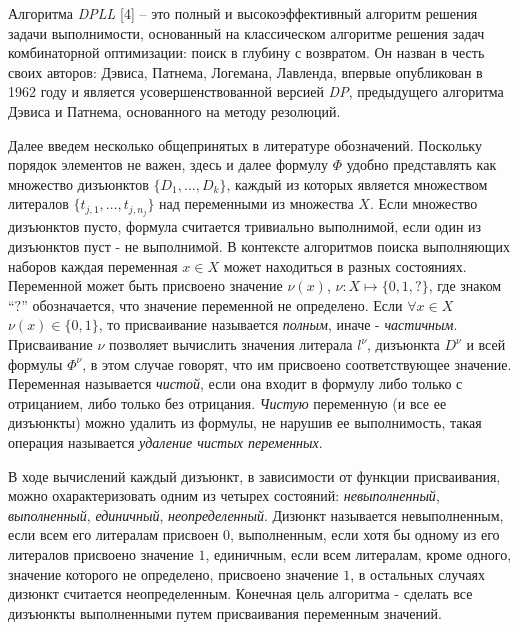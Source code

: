 Алгоритма \textit{DPLL} [4] – это полный и высокоэффективный алгоритм решения задачи выполнимости, основанный на классическом алгоритме решения задач комбинаторной оптимизации: поиск в глубину с возвратом. Он назван в честь своих авторов: Дэвиса, Патнема, Логемана, Лавленда, впервые опубликован в 1962 году и является усовершенствованной версией \textit{DP}, предыдущего алгоритма Дэвиса и Патнема, основанного на методу резолюций.

Далее введем несколько общепринятых в литературе обозначений. 
Поскольку порядок элементов не важен, здесь и далее формулу $\Phi$ удобно представлять как множество дизъюнктов $\{ D_1, \dots, D_k \}$, 
каждый из которых является множеством литералов $\{ t_{j,1}, \dots ,t_{j,n_j} \}$ над переменными из множества $X$. Если множество дизъюнктов пусто, формула считается тривиально выполнимой, если один из дизъюнктов пуст - не выполнимой.
В контексте алгоритмов поиска выполняющих наборов каждая переменная $x \in  X$ может находиться в разных состояниях. Переменной может быть присвоено значение $\nu(x)$, $\nu: X \mapsto \{ 0, 1, ?\}$, где знаком \enquote{$?$} обозначается, что значение переменной не определено. Если $\forall x \in X $ $\nu(x) \in \{ 0, 1\}$, то присваивание называется \textit{полным}, иначе - \textit{частичным}. Присваивание $\nu$ позволяет вычислить значения литерала $l^{\nu}$, дизъюнкта $D^{\nu}$ и всей формулы $\Phi^{\nu}$, в этом случае говорят, что им присвоено соответствующее значение. Переменная называется \textit{чистой}, 
если она входит в формулу либо только с отрицанием, либо только без отрицания. \textit{Чистую} переменную (и все ее дизъюнкты) можно удалить из формулы, не нарушив ее выполнимость, такая операция называется \textit{удаление чистых переменных}. 

В ходе вычислений каждый дизъюнкт, в зависимости от функции присваивания, можно охарактеризовать одним из четырех состояний: \textit{невыполненный}, \textit{выполненный}, \textit{единичный}, \textit{неопределенный}. Дизюнкт называется невыполненным, если всем его литералам присвоен $0$, выполненным, если хотя бы одному из его литералов присвоено значение $1$, единичным, если всем литералам, кроме одного, значение которого не определено, присвоено значение $1$, в остальных случаях дизюнкт считается неопределенным. Конечная цель алгоритма - сделать все дизъюнкты выполненными путем присваивания переменным значений.

